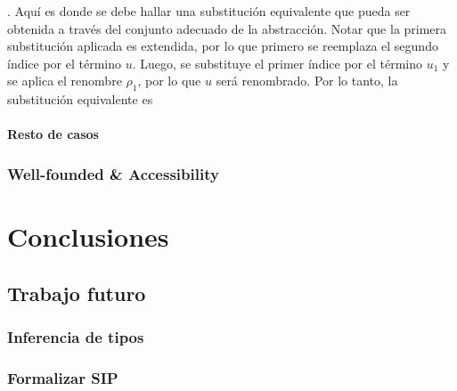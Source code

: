 \documentclass[]{report}
\begin{document}
	. Aquí es donde se debe hallar una substitución equivalente que pueda ser obtenida a través del conjunto adecuado de la abstracción.
	Notar que la primera substitución aplicada es extendida, por lo que primero se reemplaza el segundo índice por el término $u$.
	Luego, se substituye el primer índice por el término $u_1$ y se aplica el renombre $\rho_1$, por lo que $u$ será renombrado.
	Por lo tanto, la substitución equivalente es
	\AgdaSpace{}%
	\AgdaSpace{}%
	\AgdaSpace{}%
	\AgdaSpace{}%
	\AgdaSpace{}%
	\AgdaOperator{\AgdaInductiveConstructor{,}}\AgdaSpace{}%
	\AgdaSpace{}%
	\AgdaSpace{}%
	\AgdaSpace{}%
	\AgdaSpace{}%
	\AgdaSpace{}%
	\AgdaSpace{}%
	\AgdaSpace{}%
	\AgdaSpace{}%
	\AgdaSpace{}%
	
	
	\subsubsection{Resto de casos}

	
	
	
	\subsection{Well-founded \& Accessibility}
	
	
	\chapter{Conclusiones}
	
	\section{Trabajo futuro}
	\subsection{Inferencia de tipos}
	\subsection{Formalizar SIP}
	
	
	\printbibliography
	
\end{document}
